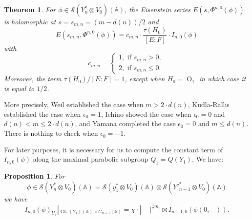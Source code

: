 \documentclass[10pt]{amsart}
\theoremstyle{plain}
\newtheorem{Thm}[equation]{Theorem}
\newtheorem{Prop}[equation]{Proposition}
\numberwithin{equation}{section}
\begin{document}
\begin{Thm}  \label{T:anisot}
For $\phi \in \mathcal{S}(Y_n^* \otimes V_0)({\mathbb{A}})$, the Eisenstein
series $E (s,  \Phi^{n,0}(\phi))$ is holomorphic at $s = s_{m,n} = (m-d(n))/2$
and 
\[  E ( s_{m,n},
\Phi^{n,0}(\phi))=  c_{m,n} \cdot \frac{\tau(H_0)}{[E:F]}   \cdot I_{n,0}(\phi)  \]
with 
\[  c_{m,n} =  \begin{cases}
1, \text{  if $s_{m,n} > 0$, } \\
2, \text{   if $s_{m,n} \leq  0$.}\end{cases} \]
Moreover, the term $\tau(H_0)/ [E:F] = 1$, except when $H_0 = {\operatorname{O}}_1$ in which case it is equal to $1/2$. 
\end{Thm}
\vskip 5pt
More precisely, Weil \cite{We} established the case when $m > 2 \cdot
d(n)$, Kudla-Rallis \cite{KR1} established the case when $\epsilon_0 =
1$, Ichino \cite{I3} showed the case when $\epsilon_0=0$ and $d(n) < m
\leq 2 \cdot d(n)$, and Yamana \cite{Y2} completed the case
$\epsilon_0 = 0$ and $m \leq d(n)$. There is nothing to check when
$\epsilon_ 0 = -1$. 
\vskip 5pt

For later purposes, it is necessary for us to compute the constant term of $I_{n,0}(\phi)$ 
 along the maximal parabolic subgroup $Q_1= Q(Y_1)$. We have:
 \vskip 5pt
 
 \begin{Prop} \label{P:aniso}
 For 
 \[ \phi \in  \mathcal{S}(Y_n^* \otimes V_0)({\mathbb{A}}) 
=   \mathcal{S}(y_1^* \otimes V_0)({\mathbb{A}}) \otimes  
\mathcal{S}({Y'}_{n-1}^* \otimes V_0)({\mathbb{A}}) \]
 we have
 \[  I_{n,0}(\phi)_{U_1}|_{{\operatorname{GL}}(Y_1)({\mathbb{A}}) \times G_{n-1}({\mathbb{A}})} 
= \chi \cdot |-|^{\frac{1}{2} m_0}  \boxtimes
I_{n-1,0}(\phi(0,-)). \] 
  \end{Prop}
 \vskip 10pt
 
\end{document}
